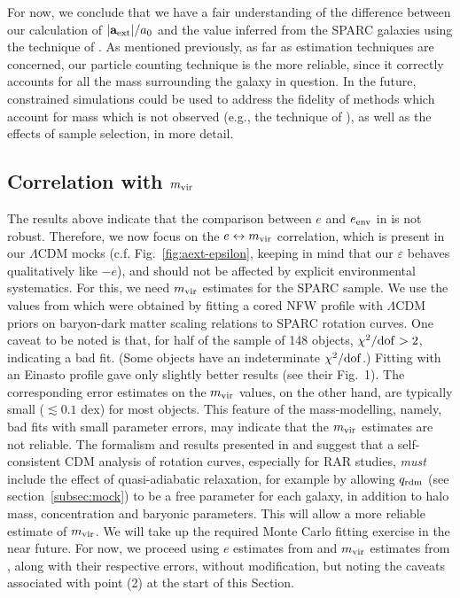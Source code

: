 \documentclass[usenatbib]{mnras}
\newcommand{\aext}{\ensuremath{\mathbf{a}_{\rm ext}}}
\begin{document}
For now, we conclude that we have a fair understanding of the difference between our calculation of $|\aext|/a_0$ and the value inferred from the SPARC galaxies using the technique of . As mentioned previously, as far as estimation techniques are concerned, our particle counting technique is the more reliable, since it correctly accounts for all the mass surrounding the galaxy in question. In the future, constrained simulations could be used to address the fidelity of methods which account for mass which is not observed (e.g., the technique of ), as well as the effects of sample selection, in more detail.  

\subsection{Correlation with $m_{\rm vir}$}
The results above indicate that the comparison between $e$ and $e_{\rm env}$ in  is not robust. Therefore, we now focus on the $e\leftrightarrow m_{\rm vir}$ correlation, which is present in our $\Lambda$CDM mocks (c.f. Fig.~\ref{fig:aext-epsilon}, keeping in mind that our $\varepsilon$ behaves qualitatively like $-e$), and should not be affected by explicit environmental systematics.  For this, we need $m_{\rm vir}$ estimates for the SPARC sample.  We use the values from \citet{llms20} which were obtained by fitting a cored NFW profile with $\Lambda$CDM priors on baryon-dark matter scaling relations to SPARC rotation curves.  One caveat to be noted is that, for half of the sample of 148 objects, $\chi^2/{\rm dof}>2$, indicating a bad fit. (Some objects have an indeterminate $\chi^2/{\rm dof}$.) Fitting with an Einasto profile gave only slightly better results (see their Fig.~1). The corresponding error estimates on the $m_{\rm vir}$ values, on the other hand, are typically small ($\lesssim0.1$ dex) for most objects. This feature of the \citet{llms20} mass-modelling, namely, bad fits with small parameter errors, may indicate that the $m_{\rm vir}$ estimates are not reliable.  The formalism and results presented in  and  suggest that a self-consistent CDM analysis of rotation curves, especially for RAR studies, \emph{must} include the effect of quasi-adiabatic relaxation, for example by allowing $q_{\rm rdm}$ (see section~\ref{subsec:mock}) to be a free parameter for each galaxy, in addition to halo mass, concentration and baryonic parameters.  This will allow a more reliable estimate of $m_{\rm vir}$.
We will take up the required Monte Carlo fitting exercise in the near future. For now, we proceed using $e$ estimates from  and $m_{\rm vir}$ estimates from \citet{llms20}, along with their respective errors, without modification, but noting the caveats associated with point (2) at the start of this Section.
\end{document}
